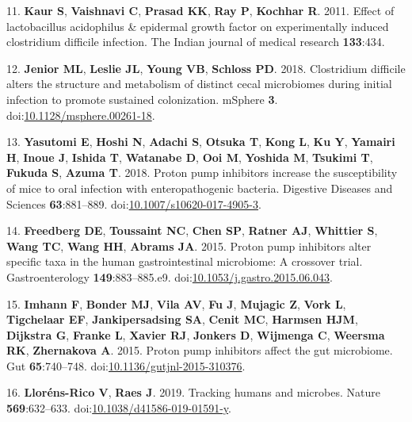 \documentclass[11pt,]{article}
\begin{document}
\hypertarget{ref-kaur2011effect}{}
11. \textbf{Kaur S}, \textbf{Vaishnavi C}, \textbf{Prasad KK},
\textbf{Ray P}, \textbf{Kochhar R}. 2011. Effect of lactobacillus
acidophilus \& epidermal growth factor on experimentally induced
clostridium difficile infection. The Indian journal of medical research
\textbf{133}:434.

\hypertarget{ref-Jenior2018}{}
12. \textbf{Jenior ML}, \textbf{Leslie JL}, \textbf{Young VB},
\textbf{Schloss PD}. 2018. Clostridium difficile alters the structure
and metabolism of distinct cecal microbiomes during initial infection to
promote sustained colonization. mSphere \textbf{3}.
doi:\href{https://doi.org/10.1128/msphere.00261-18}{10.1128/msphere.00261-18}.

\hypertarget{ref-Yasutomi2018}{}
13. \textbf{Yasutomi E}, \textbf{Hoshi N}, \textbf{Adachi S},
\textbf{Otsuka T}, \textbf{Kong L}, \textbf{Ku Y}, \textbf{Yamairi H},
\textbf{Inoue J}, \textbf{Ishida T}, \textbf{Watanabe D}, \textbf{Ooi
M}, \textbf{Yoshida M}, \textbf{Tsukimi T}, \textbf{Fukuda S},
\textbf{Azuma T}. 2018. Proton pump inhibitors increase the
susceptibility of mice to oral infection with enteropathogenic bacteria.
Digestive Diseases and Sciences \textbf{63}:881--889.
doi:\href{https://doi.org/10.1007/s10620-017-4905-3}{10.1007/s10620-017-4905-3}.

\hypertarget{ref-Freedberg2015}{}
14. \textbf{Freedberg DE}, \textbf{Toussaint NC}, \textbf{Chen SP},
\textbf{Ratner AJ}, \textbf{Whittier S}, \textbf{Wang TC}, \textbf{Wang
HH}, \textbf{Abrams JA}. 2015. Proton pump inhibitors alter specific
taxa in the human gastrointestinal microbiome: A crossover trial.
Gastroenterology \textbf{149}:883--885.e9.
doi:\href{https://doi.org/10.1053/j.gastro.2015.06.043}{10.1053/j.gastro.2015.06.043}.

\hypertarget{ref-Imhann2015}{}
15. \textbf{Imhann F}, \textbf{Bonder MJ}, \textbf{Vila AV}, \textbf{Fu
J}, \textbf{Mujagic Z}, \textbf{Vork L}, \textbf{Tigchelaar EF},
\textbf{Jankipersadsing SA}, \textbf{Cenit MC}, \textbf{Harmsen HJM},
\textbf{Dijkstra G}, \textbf{Franke L}, \textbf{Xavier RJ},
\textbf{Jonkers D}, \textbf{Wijmenga C}, \textbf{Weersma RK},
\textbf{Zhernakova A}. 2015. Proton pump inhibitors affect the gut
microbiome. Gut \textbf{65}:740--748.
doi:\href{https://doi.org/10.1136/gutjnl-2015-310376}{10.1136/gutjnl-2015-310376}.

\hypertarget{ref-LlornsRico2019}{}
16. \textbf{Lloréns-Rico V}, \textbf{Raes J}. 2019. Tracking humans and
microbes. Nature \textbf{569}:632--633.
doi:\href{https://doi.org/10.1038/d41586-019-01591-y}{10.1038/d41586-019-01591-y}.
\end{document}
